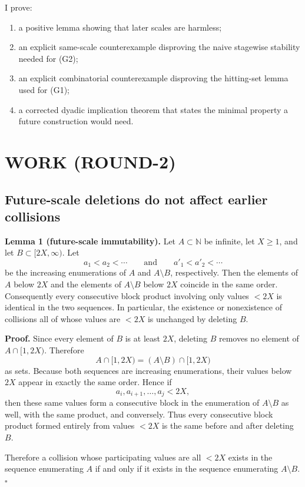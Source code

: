 I prove:

\begin{enumerate}
\item a positive lemma showing that later scales are harmless;
\item an explicit same-scale counterexample disproving the naive stagewise stability needed for (G2);
\item an explicit combinatorial counterexample disproving the hitting-set lemma used for (G1);
\item a corrected dyadic implication theorem that states the minimal property a future construction would need.
\end{enumerate}

\section{WORK (ROUND-2)}

\subsection{Future-scale deletions do not affect earlier collisions}

\textbf{Lemma 1 (future-scale immutability).}
Let $A\subset \mathbb N$ be infinite, let $X\ge 1$, and let $B\subset [2X,\infty)$. Let
\[
a_1<a_2<\cdots
\qquad\text{and}\qquad
 a'_1<a'_2<\cdots
\]
be the increasing enumerations of $A$ and $A\setminus B$, respectively. Then the elements of $A$ below $2X$ and the elements of $A\setminus B$ below $2X$ coincide in the same order. Consequently every consecutive block product involving only values $<2X$ is identical in the two sequences. In particular, the existence or nonexistence of collisions all of whose values are $<2X$ is unchanged by deleting $B$.

\textbf{Proof.}
Since every element of $B$ is at least $2X$, deleting $B$ removes no element of $A\cap [1,2X)$. Therefore
\[
A\cap [1,2X)=(A\setminus B)\cap [1,2X)
\]
as sets. Because both sequences are increasing enumerations, their values below $2X$ appear in exactly the same order. Hence if
\[
a_i,a_{i+1},\dots,a_j < 2X,
\]
then these same values form a consecutive block in the enumeration of $A\setminus B$ as well, with the same product, and conversely. Thus every consecutive block product formed entirely from values $<2X$ is the same before and after deleting $B$.

Therefore a collision whose participating values are all $<2X$ exists in the sequence enumerating $A$ if and only if it exists in the sequence enumerating $A\setminus B$. \hfill$\square$

